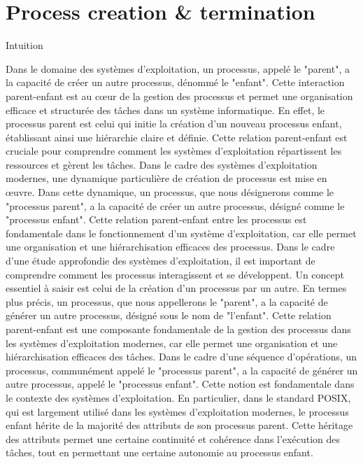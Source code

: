 \documentclass[12pt]{article}
\begin{document}
\section{Process creation \& termination}
\begin{myvulga}{Intuition}
\end{myvulga}
Dans le domaine des systèmes d'exploitation, un processus, appelé le "parent", a la capacité de créer un autre processus, dénommé le "enfant". Cette interaction parent-enfant est au cœur de la gestion des processus et permet une organisation efficace et structurée des tâches dans un système informatique. En effet, le processus parent est celui qui initie la création d'un nouveau processus enfant, établissant ainsi une hiérarchie claire et définie. Cette relation parent-enfant est cruciale pour comprendre comment les systèmes d'exploitation répartissent les ressources et gèrent les tâches.
Dans le cadre des systèmes d'exploitation modernes, une dynamique particulière de création de processus est mise en œuvre. Dans cette dynamique, un processus, que nous désignerons comme le "processus parent", a la capacité de créer un autre processus, désigné comme le "processus enfant". Cette relation parent-enfant entre les processus est fondamentale dans le fonctionnement d'un système d'exploitation, car elle permet une organisation et une hiérarchisation efficaces des processus.
Dans le cadre d'une étude approfondie des systèmes d'exploitation, il est important de comprendre comment les processus interagissent et se développent. Un concept essentiel à saisir est celui de la création d'un processus par un autre. En termes plus précis, un processus, que nous appellerons le "parent", a la capacité de générer un autre processus, désigné sous le nom de "l'enfant". Cette relation parent-enfant est une composante fondamentale de la gestion des processus dans les systèmes d'exploitation modernes, car elle permet une organisation et une hiérarchisation efficaces des tâches.
Dans le cadre d'une séquence d'opérations, un processus, communément appelé le "processus parent", a la capacité de générer un autre processus, appelé le "processus enfant". Cette notion est fondamentale dans le contexte des systèmes d'exploitation. En particulier, dans le standard POSIX, qui est largement utilisé dans les systèmes d'exploitation modernes, le processus enfant hérite de la majorité des attributs de son processus parent. Cette héritage des attributs permet une certaine continuité et cohérence dans l'exécution des tâches, tout en permettant une certaine autonomie au processus enfant.
\end{document}
